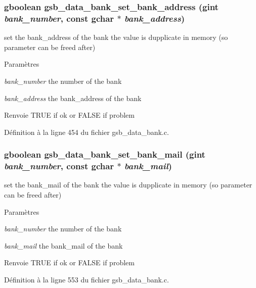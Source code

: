 \subsubsection[{gsb\_\-data\_\-bank\_\-set\_\-bank\_\-address}]{\setlength{\rightskip}{0pt plus 5cm}gboolean gsb\_\-data\_\-bank\_\-set\_\-bank\_\-address (gint {\em bank\_\-number}, \/  const gchar $\ast$ {\em bank\_\-address})}\label{gsb__data__bank_8h_afa3fbafdb2909d1f31b9966e0c09c28f}
set the bank\_\-address of the bank the value is dupplicate in memory (so parameter can be freed after)


\begin{DoxyParams}{Paramètres}
\item[{\em bank\_\-number}]the number of the bank \item[{\em bank\_\-address}]the bank\_\-address of the bank\end{DoxyParams}
\begin{DoxyReturn}{Renvoie}
TRUE if ok or FALSE if problem 
\end{DoxyReturn}


Définition à la ligne 454 du fichier gsb\_\-data\_\-bank.c.

\subsubsection[{gsb\_\-data\_\-bank\_\-set\_\-bank\_\-mail}]{\setlength{\rightskip}{0pt plus 5cm}gboolean gsb\_\-data\_\-bank\_\-set\_\-bank\_\-mail (gint {\em bank\_\-number}, \/  const gchar $\ast$ {\em bank\_\-mail})}\label{gsb__data__bank_8h_a83aede078ed8c5b81800e39e1068fab0}
set the bank\_\-mail of the bank the value is dupplicate in memory (so parameter can be freed after)


\begin{DoxyParams}{Paramètres}
\item[{\em bank\_\-number}]the number of the bank \item[{\em bank\_\-mail}]the bank\_\-mail of the bank\end{DoxyParams}
\begin{DoxyReturn}{Renvoie}
TRUE if ok or FALSE if problem 
\end{DoxyReturn}


Définition à la ligne 553 du fichier gsb\_\-data\_\-bank.c.

